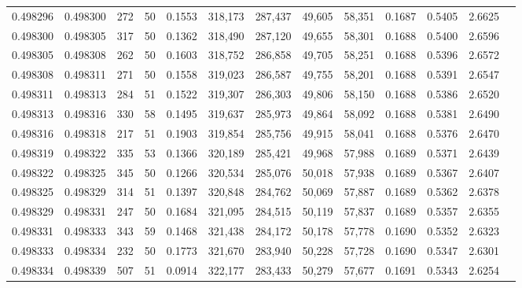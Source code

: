 \begin{tabular}{rrrrrrrrrrrrr}
0.498296 & 0.498300 & 272 &  50 &                                     0.1553 & 318,173 & 287,437 &  49,605 &  58,351 & 0.1687 & 0.5405 & 2.6625 \\
0.498300 & 0.498305 & 317 &  50 &                                     0.1362 & 318,490 & 287,120 &  49,655 &  58,301 & 0.1688 & 0.5400 & 2.6596 \\
0.498305 & 0.498308 & 262 &  50 &                                     0.1603 & 318,752 & 286,858 &  49,705 &  58,251 & 0.1688 & 0.5396 & 2.6572 \\
0.498308 & 0.498311 & 271 &  50 &                                     0.1558 & 319,023 & 286,587 &  49,755 &  58,201 & 0.1688 & 0.5391 & 2.6547 \\
0.498311 & 0.498313 & 284 &  51 &                                     0.1522 & 319,307 & 286,303 &  49,806 &  58,150 & 0.1688 & 0.5386 & 2.6520 \\
0.498313 & 0.498316 & 330 &  58 &                                     0.1495 & 319,637 & 285,973 &  49,864 &  58,092 & 0.1688 & 0.5381 & 2.6490 \\
0.498316 & 0.498318 & 217 &  51 &                                     0.1903 & 319,854 & 285,756 &  49,915 &  58,041 & 0.1688 & 0.5376 & 2.6470 \\
0.498319 & 0.498322 & 335 &  53 &                                     0.1366 & 320,189 & 285,421 &  49,968 &  57,988 & 0.1689 & 0.5371 & 2.6439 \\
0.498322 & 0.498325 & 345 &  50 &                                     0.1266 & 320,534 & 285,076 &  50,018 &  57,938 & 0.1689 & 0.5367 & 2.6407 \\
0.498325 & 0.498329 & 314 &  51 &                                     0.1397 & 320,848 & 284,762 &  50,069 &  57,887 & 0.1689 & 0.5362 & 2.6378 \\
0.498329 & 0.498331 & 247 &  50 &                                     0.1684 & 321,095 & 284,515 &  50,119 &  57,837 & 0.1689 & 0.5357 & 2.6355 \\
0.498331 & 0.498333 & 343 &  59 &                                     0.1468 & 321,438 & 284,172 &  50,178 &  57,778 & 0.1690 & 0.5352 & 2.6323 \\
0.498333 & 0.498334 & 232 &  50 &                                     0.1773 & 321,670 & 283,940 &  50,228 &  57,728 & 0.1690 & 0.5347 & 2.6301 \\
0.498334 & 0.498339 & 507 &  51 &                                     0.0914 & 322,177 & 283,433 &  50,279 &  57,677 & 0.1691 & 0.5343 & 2.6254 \\

\end{tabular}

